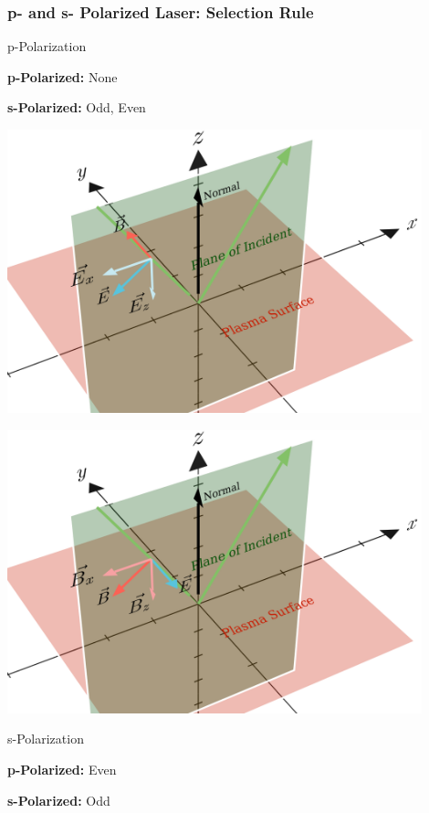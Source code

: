 \documentclass{beamer}
\begin{document}
\begin{frame}
    \frametitle{p- and s- Polarized Laser: Selection Rule}
    \begin{minipage}[h]{0.18\linewidth}
        \small{p-Polarization}
        \tiny{
            \textbf{p-Polarized:} None

            \textbf{s-Polarized:} Odd, Even}
    \end{minipage}
    \begin{minipage}[h]{0.8\linewidth}
        \centering
        \includegraphics[width=0.9\textwidth, height=0.42\textheight]{images/p.png}
        \label{fig:p}
    \end{minipage}

    \begin{minipage}[h]{0.8\linewidth}
        \centering
        \includegraphics[width=0.9\textwidth, height=0.42\textheight]{images/s.png}
        \label{fig:s}
    \end{minipage}
    \begin{minipage}[h]{0.18\linewidth}
        \small{s-Polarization}
        \tiny{
            \textbf{p-Polarized:} Even

            \textbf{s-Polarized:} Odd}
    \end{minipage}

\end{frame}
\end{document}
